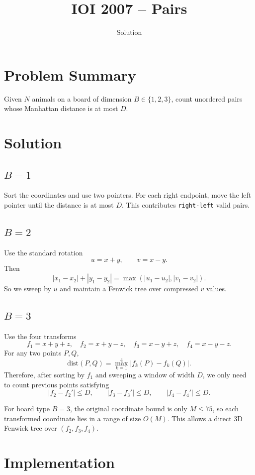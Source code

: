 \documentclass[11pt,a4paper]{article}
\title{IOI 2007 -- Pairs}
\author{Solution}
\date{}
\begin{document}
\maketitle

\section{Problem Summary}
Given $N$ animals on a board of dimension $B \in \{1,2,3\}$, count unordered pairs whose Manhattan distance is at most $D$.

\section{Solution}

\subsection{$B=1$}
Sort the coordinates and use two pointers. For each right endpoint, move the left pointer until the distance is at most $D$. This contributes \texttt{right-left} valid pairs.

\subsection{$B=2$}
Use the standard rotation
\[
u = x + y,\qquad v = x - y.
\]
Then
\[
|x_1-x_2| + |y_1-y_2| = \max(|u_1-u_2|, |v_1-v_2|).
\]
So we sweep by $u$ and maintain a Fenwick tree over compressed $v$ values.

\subsection{$B=3$}
Use the four transforms
\[
f_1 = x+y+z,\quad
f_2 = x+y-z,\quad
f_3 = x-y+z,\quad
f_4 = x-y-z.
\]
For any two points $P,Q$,
\[
\mathrm{dist}(P,Q)
= \max_{k=1}^{4} |f_k(P)-f_k(Q)|.
\]
Therefore, after sorting by $f_1$ and sweeping a window of width $D$, we only need to count previous points satisfying
\[
|f_2-f_2'| \le D,\qquad
|f_3-f_3'| \le D,\qquad
|f_4-f_4'| \le D.
\]

For board type $B=3$, the original coordinate bound is only $M \le 75$, so each transformed coordinate lies in a range of size $O(M)$. This allows a direct 3D Fenwick tree over $(f_2,f_3,f_4)$.

\section{Implementation}
\end{document}
